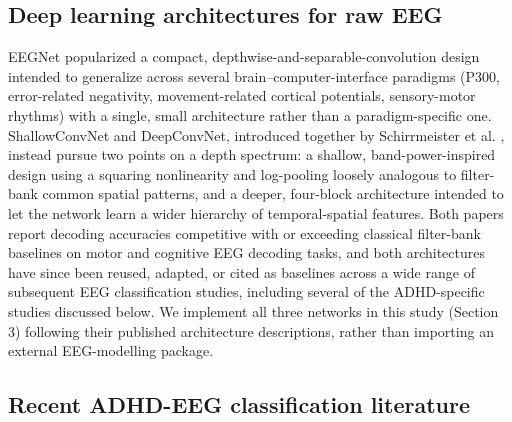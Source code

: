 \documentclass[a4paper,fleqn]{cas-sc}
\begin{document}
\subsection{Deep learning architectures for raw EEG}

EEGNet \cite{lawhern2018eegnet} popularized a compact, depthwise-and-separable-convolution design intended to generalize across several brain--computer-interface paradigms (P300, error-related negativity, movement-related cortical potentials, sensory-motor rhythms) with a single, small architecture rather than a paradigm-specific one. ShallowConvNet and DeepConvNet, introduced together by Schirrmeister et al. \cite{schirrmeister2017deep}, instead pursue two points on a depth spectrum: a shallow, band-power-inspired design using a squaring nonlinearity and log-pooling loosely analogous to filter-bank common spatial patterns, and a deeper, four-block architecture intended to let the network learn a wider hierarchy of temporal-spatial features. Both papers report decoding accuracies competitive with or exceeding classical filter-bank baselines on motor and cognitive EEG decoding tasks, and both architectures have since been reused, adapted, or cited as baselines across a wide range of subsequent EEG classification studies, including several of the ADHD-specific studies discussed below. We implement all three networks in this study (Section 3) following their published architecture descriptions, rather than importing an external EEG-modelling package.



\subsection{Recent ADHD-EEG classification literature}
\end{document}
